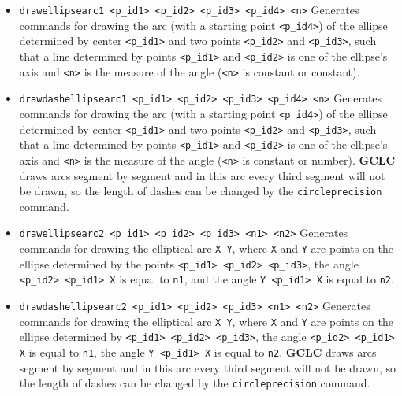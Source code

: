 \documentclass[a4paper]{book}
\newcommand{\gclc}{{\bfseries GCLC}\xspace}
\begin{document}
\begin{itemize}
\item \verb|drawellipsearc1 <p_id1> <p_id2> <p_id3> <p_id4> <n>|
        Generates commands for drawing the arc (with a starting
        point \verb|<p_id4>|) of the ellipse
        determined by center \verb|<p_id1>| and two points
        \verb|<p_id2>| and \verb|<p_id3>|, such that a line
        determined by points \verb|<p_id1>| and \verb|<p_id2>|
        is one of the ellipse's axis and \verb|<n>| is the measure of
        the angle (\verb|<n>| is constant or {\sc constant}).

\item \verb|drawdashellipsearc1 <p_id1> <p_id2> <p_id3> <p_id4> <n>|
        Generates com\-mands for drawing the arc (with a starting
        point \verb|<p_id4>|) of the ellipse
        determined by center \verb|<p_id1>| and two points
        \verb|<p_id2>| and \verb|<p_id3>|, such that a line
        determined by points \verb|<p_id1>| and \verb|<p_id2>|
        is one of the ellipse's axis and \verb|<n>| is the measure of
        the angle (\verb|<n>| is constant or {\sc number}).
        \gclc draws arcs segment by segment and in this arc
        every third segment will not be drawn, so the length
        of dashes can be changed by the \verb|circleprecision| command.


\item \verb|drawellipsearc2 <p_id1> <p_id2> <p_id3> <n1> <n2>|
        Generates commands for drawing the elliptical arc
        \verb|X Y|, where \verb|X| and \verb|Y| are points on
        the ellipse determined by the points \verb|<p_id1> <p_id2> <p_id3>|,
        the angle \verb|<p_id2> <p_id1> X| is equal to \verb|n1|, and
        the angle \verb|Y <p_id1> X| is equal to \verb|n2|.

\item \verb|drawdashellipsearc2 <p_id1> <p_id2> <p_id3> <n1> <n2>|
        Generates commands for drawing the elliptical arc
        \verb|X Y|, where \verb|X| and \verb|Y| are points on
        the ellipse determined by \verb|<p_id1> <p_id2> <p_id3>|,
        the angle \verb|<p_id2> <p_id1> X| is equal to \verb|n1|,
        the angle \verb|Y <p_id1> X| is equal to \verb|n2|.
        \gclc draws arcs segment by segment and in this arc
        every third segment will not be drawn, so the length of
        dashes can be changed by the \verb|circleprecision| command.


\end{itemize}
\end{document}
